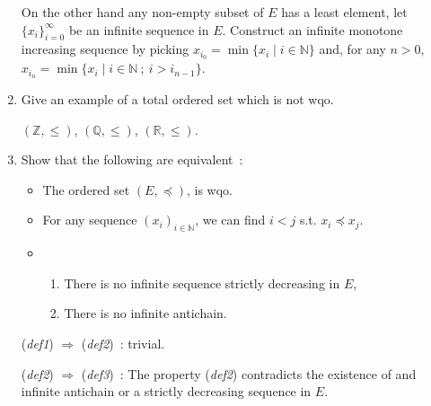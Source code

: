 \documentclass[a4paper,11pt]{exam}
\newcommand{\Z}{\mathbb{Z}}
\newcommand{\N}{\mathbb{N}}
\newcommand{\Q}{\mathbb{Q}}
\newcommand{\R}{\mathbb{R}}
\begin{document}
\begin{questions}
\begin{enumerate}
\begin{solution}
				On the other hand any non-empty subset of $E$ has a least element, let $\{x_i\}_{i=0}^\infty$ be an infinite sequence in $E$. Construct an infinite monotone increasing sequence by picking $x_{i_0} = \min\{ x_i \mid i\in\N \}$ and, for any $n > 0$, $x_{i_n} = \min\{ x_i \mid i\in\N~;~i > i_{n-1} \}$.
				
			\end{solution}
			
			\item Give an example of a total ordered set which is not wqo.
			
			\begin{solution}
				$(\Z,\leq)$, $(\Q,\leq)$, $(\R,\leq)$.
			\end{solution}
			
			\item Show that the following are equivalent~:
			\begin{itemize}
				\item[(\textit{def1})] The ordered set $(E,\preccurlyeq)$,  
				is wqo.
				\item[(\textit{def2})]
				For any sequence $(x_i)_{i\in\N}$, we can find $i<j$ s.t. $x_i\preccurlyeq x_j$.
				\item[(\textit{def3})] 
				\begin{enumerate}[label=(\roman*)]
					\item There is no infinite sequence strictly decreasing in $E$,
					\item There is no infinite antichain.
				\end{enumerate}
			\end{itemize}
			
			\begin{solution}
				(\textit{def1}) $\Rightarrow$ (\textit{def2})~:
				trivial.
				
				(\textit{def2}) $\Rightarrow$ (\textit{def3})~:
				The property (\textit{def2}) contradicts the existence of and infinite antichain or a strictly decreasing sequence in $E$.
				

\end{solution}
\end{enumerate}
\end{questions}
\end{document}
